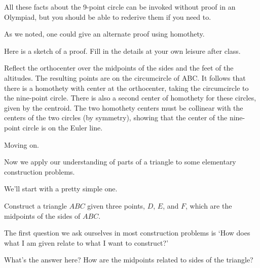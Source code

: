 All these facts about the 9-point circle can be invoked without proof in an Olympiad, but you should be able to rederive them if you need to.

As we noted, one could give an alternate proof using homothety.

Here is a sketch of a proof. Fill in the details at your own leisure after class.

Reflect the orthocenter over the midpoints of the sides and the feet of the altitudes. The resulting points are on the circumcircle of ABC. It follows that there is a homothety with center at the orthocenter, taking the circumcircle to the nine-point circle. There is also a second center of homothety for these circles, given by the centroid. The two homothety centers must be collinear with the centers of the two circles (by symmetry), showing that the center of the nine-point circle is on the Euler line.

\vspace{10pt}
Moving on.

Now we apply our understanding of parts of a triangle to some elementary construction problems.

We'll start with a pretty simple one. 
\begin{example}
    Construct a triangle $ABC$ given three points, $D$, $E$, and $F$, which are the midpoints of the sides of $ABC$.    
\end{example}

The first question we ask ourselves in most construction problems is `How does what I am given relate to what I want to construct?'

What's the answer here?  How are the midpoints related to sides of the triangle?




